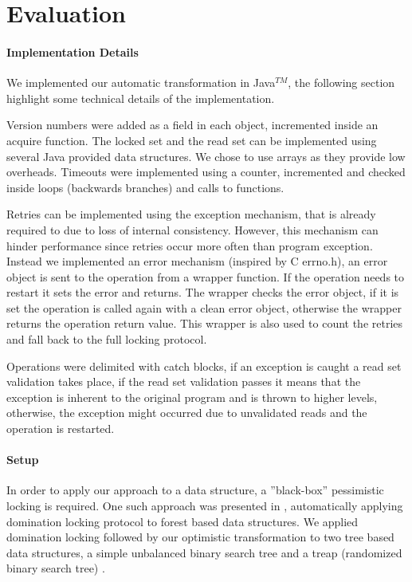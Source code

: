 \section{Evaluation}\label{sec:eval}

\paragraph{Implementation Details}
We implemented our automatic transformation in Java$^{TM}$, 
the following section highlight some technical details of 
the implementation.

Version numbers were added as a field in each object, 
incremented inside an acquire function. The
locked set and the read set can be implemented using several Java 
provided data structures. We chose to use arrays as they provide low 
overheads. Timeouts were implemented using a counter, incremented and checked
inside loops (backwards branches) and calls to functions.

Retries can be implemented using the exception mechanism,
that is already required to due to loss of internal consistency. 
However, this mechanism can hinder performance since retries occur 
more often than program exception. Instead we implemented an error mechanism
(inspired by C errno.h), an error object is sent to the operation from 
a wrapper function. If the operation needs to restart it sets the error and
returns. The wrapper checks the error object, if it is set the operation
is called again with a clean error object, otherwise the wrapper returns 
the operation return value. This wrapper is also used to count the retries
and fall back to the full locking protocol.

Operations were delimited with catch blocks, if an exception
is caught a read set validation takes place, 
if the read set validation passes it means that the exception  is inherent
to the original program and is thrown to higher levels, otherwise, the
exception might occurred due to unvalidated reads and the operation is
restarted. 

\paragraph{Setup}
In order to apply our approach to a data structure, a
''black-box'' pessimistic locking is required. One such 
approach was presented in \cite{Gueta2011}, automatically 
applying domination locking protocol to forest based data structures.  
We applied domination locking followed by our optimistic 
transformation to two tree based data structures, 
a simple unbalanced binary search tree 
and a treap (randomized binary search tree) \cite{AragonS1989}.

